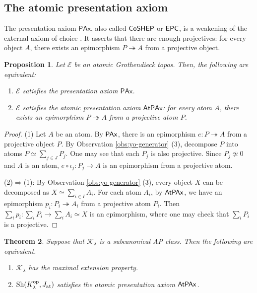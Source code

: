 \documentclass[10pt]{amsart}
\numberwithin{equation}{section}
\theoremstyle{plain}
\newtheorem{theorem}{Theorem}[section]
\newtheorem{prop}[theorem]{Proposition}
\theoremstyle{definition}
\newcommand{\K}{\mathcal{K}}
\newcommand{\surj}{\twoheadrightarrow}
\begin{document}
\subsection{The atomic presentation axiom}
The presentation axiom $\textsf{PAx}$, also called ${\sf CoSHEP}$ or ${\sf EPC}$, is a weakening of the external axiom of choice \cite{Acz78,Bla79}.
It asserts that there are enough projectives: for every object $A$, there exists an epimorphism $P\surj A$ from a projective object.

\begin{prop}
Let $\mathcal{E}$ be an atomic Grothendieck topos.
Then, the following are equivalent:
\begin{enumerate}
\item $\mathcal{E}$ satisfies the presentation axiom $\mathsf{PAx}$.
\item $\mathcal{E}$ satisfies the atomic presentation axiom $\mathsf{AtPAx}$: for every atom $A$, there exists an epimorphism $P\surj A$ from a projective atom $P$.
\end{enumerate}
\end{prop}

\begin{proof}
(1) Let $A$ be an atom.
By ${\sf PAx}$, there is an epimorphism $e\colon P\surj A$ from a projective object $P$.
By Observation \ref{obs:yo-generator} (3), decompose $P$ into atoms $P\simeq\sum_{j\in J}P_j$.
One may see that each $P_j$ is also projective.
Since $P_j\not\simeq 0$ and $A$ is an atom, $e\circ\iota_j\colon P_j\to A$ is an epimorphism from a projective atom.

(2)$\Rightarrow$(1):
By Observation \ref{obs:yo-generator} (3), every object $X$ can be decomposed as $X\simeq \sum_{i\in I} A_i$.
For each atom $A_i$, by ${\sf AtPAx}$, we have an epimorphism $p_i\colon P_i\surj A_i$ from a projective atom $P_i$.
Then $\sum_i p_i\colon \sum_i P_i\to \sum_i A_i\simeq X$ is an epimorphism, where one may check that $\sum_iP_i$ is a projective.
\end{proof}


\begin{theorem}\label{thm:maximal-cofinal-theorem}
Suppose that $\K_\lambda$ is a subcanonical AP class.
Then the following are equivalent.
\begin{enumerate}
\item $\K_\lambda$ has the maximal extension property.
\item ${\rm Sh}(K_\lambda^{\rm op},J_{\rm at})$ satisfies the atomic presentation axiom ${\sf AtPAx}$.
\end{enumerate}
\end{theorem}
\end{document}
